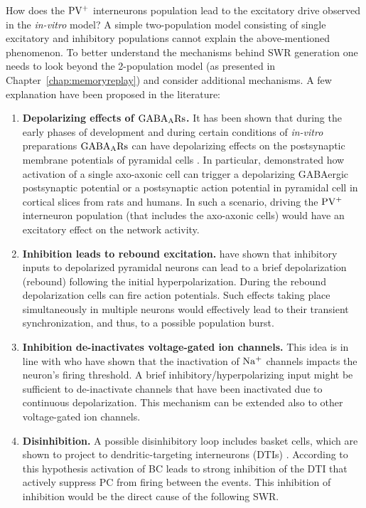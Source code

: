     How does the $\rm PV^+$ interneurons population lead to the excitatory
    drive observed in the {\it in-vitro} model? A simple two-population model
    consisting of single excitatory and inhibitory populations cannot explain
    the above-mentioned phenomenon. To better understand the mechanisms behind
    SWR generation one needs to look beyond the 2-population model (as
    presented in Chapter~\ref{chap:memoryreplay}) and consider additional
    mechanisms. A few explanation have been proposed in the literature:
    \begin{enumerate}
      \item \textbf{Depolarizing effects of $\rm GABA_ARs$.} It has been shown
        that during the early phases of development and during certain
        conditions of {\it in-vitro} preparations $\rm GABA_ARs$ can have
        depolarizing effects on the postsynaptic membrane potentials of
        pyramidal cells \citep{Cohen2002, Gulledge2003, Banke2006}. In
        particular, \cite{Szabadics2006} demonstrated how activation of a
        single axo-axonic cell can trigger a depolarizing GABAergic
        postsynaptic potential or a postsynaptic action potential in pyramidal
        cell in cortical slices from rats and humans. In such a scenario,
        driving the $\rm PV^+$ interneuron population (that includes the
        axo-axonic cells) would have an excitatory effect on the network
        activity.
      \item \textbf{Inhibition leads to rebound excitation.} \cite{Cobb1995}
        have shown that inhibitory inputs to depolarized pyramidal neurons can
        lead to a brief depolarization (rebound) following the initial
        hyperpolarization. During the rebound depolarization cells can fire
        action potentials. Such effects taking place simultaneously in multiple
        neurons would effectively lead to their transient synchronization, and
        thus, to a possible population burst.
      \item \textbf{Inhibition de-inactivates voltage-gated ion channels.} This
        idea is in line with \cite{Platkiewicz2011} who have shown that the
        inactivation of $\rm Na^+$ channels impacts the neuron's firing
        threshold. A brief inhibitory/hyperpolarizing input might be sufficient
        to de-inactivate channels that have been inactivated due to continuous
        depolarization. This mechanism can be extended also to other
        voltage-gated ion channels. 
      \item \textbf{Disinhibition.} A possible disinhibitory loop includes
        basket cells, which are shown to project to dendritic-targeting
        interneurons (DTIs) \citep{Cobb1997, Kohus2016}. According to this
        hypothesis activation of BC leads to strong inhibition of the DTI that
        actively suppress PC from firing between the events. This inhibition of
        inhibition would be the direct cause of the following SWR.
    \end{enumerate}
    
